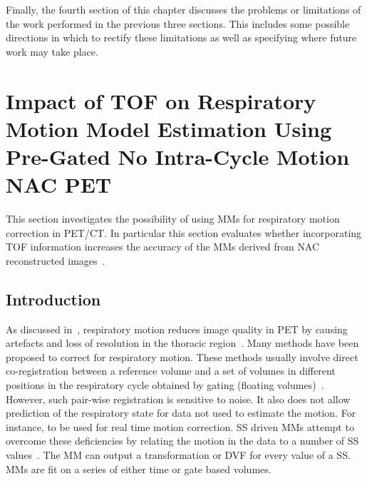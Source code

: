         Finally, the fourth section of this chapter discusses the problems or limitations of the work performed in the previous three sections. This includes some possible directions in which to rectify these limitations as well as specifying where future work may take place.
    
    
    \section{Impact of TOF on Respiratory Motion Model Estimation Using Pre-Gated No Intra-Cycle Motion NAC PET} \label{sec:impact_of_tof_on_respiratory_motion_model_estimation_using_pre_gated_no_intra_cycle_motion_nac_pet}
        This section investigates the possibility of using \glspl{MM} for respiratory motion correction in \gls{PET}/\gls{CT}. In particular this section evaluates whether incorporating \gls{TOF} information increases the accuracy of the \glspl{MM} derived from \gls{NAC} reconstructed images~\parencite{Whitehead2019ImpactPET}.
        
        \subsection{Introduction} \label{sec:impact_of_tof_on_respiratory_motion_model_estimation_using_pre_gated_no_intra_cycle_motion_nac_pet_introduction}
        As discussed in~, respiratory motion reduces image quality in \gls{PET} by causing artefacts and loss of resolution in the thoracic region~\parencite{Nehmeh2008a}. Many methods have been proposed to correct for respiratory motion. These methods usually involve direct co-registration between a reference volume and a set of volumes in different positions in the respiratory cycle obtained by gating (floating volumes)~\parencite{Oliveira2014}. However, such pair-wise registration is sensitive to noise. It also does not allow prediction of the respiratory state for data not used to estimate the motion. For instance, to be used for real time motion correction. \gls{SS} driven \glspl{MM} attempt to overcome these deficiencies by relating the motion in the data to a number of \gls{SS} values~\parencite{McClelland2013}. The \gls{MM} can output a transformation or \gls{DVF} for every value of a \gls{SS}. \glspl{MM} are fit on a series of either time or gate based volumes.

